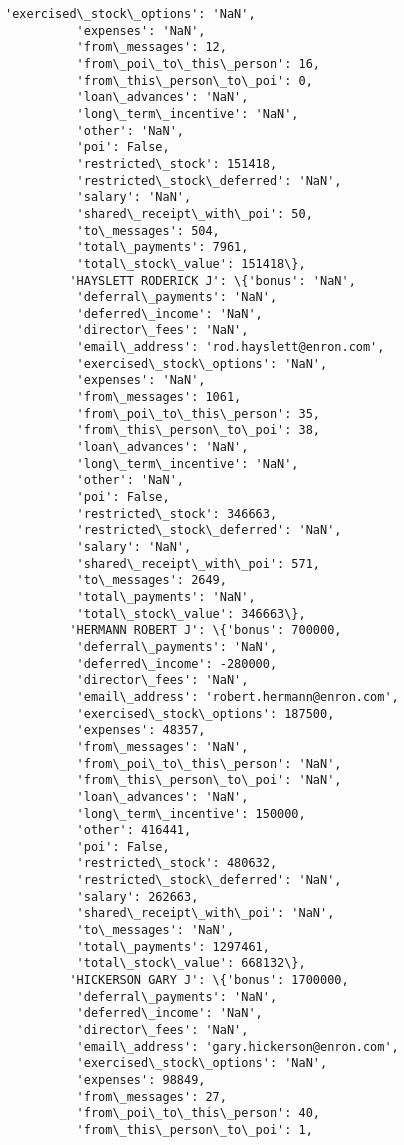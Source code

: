 \documentclass[11pt]{article}
\begin{document}
\begin{Verbatim}[commandchars=\\\{\}]
          'exercised\_stock\_options': 'NaN',
          'expenses': 'NaN',
          'from\_messages': 12,
          'from\_poi\_to\_this\_person': 16,
          'from\_this\_person\_to\_poi': 0,
          'loan\_advances': 'NaN',
          'long\_term\_incentive': 'NaN',
          'other': 'NaN',
          'poi': False,
          'restricted\_stock': 151418,
          'restricted\_stock\_deferred': 'NaN',
          'salary': 'NaN',
          'shared\_receipt\_with\_poi': 50,
          'to\_messages': 504,
          'total\_payments': 7961,
          'total\_stock\_value': 151418\},
         'HAYSLETT RODERICK J': \{'bonus': 'NaN',
          'deferral\_payments': 'NaN',
          'deferred\_income': 'NaN',
          'director\_fees': 'NaN',
          'email\_address': 'rod.hayslett@enron.com',
          'exercised\_stock\_options': 'NaN',
          'expenses': 'NaN',
          'from\_messages': 1061,
          'from\_poi\_to\_this\_person': 35,
          'from\_this\_person\_to\_poi': 38,
          'loan\_advances': 'NaN',
          'long\_term\_incentive': 'NaN',
          'other': 'NaN',
          'poi': False,
          'restricted\_stock': 346663,
          'restricted\_stock\_deferred': 'NaN',
          'salary': 'NaN',
          'shared\_receipt\_with\_poi': 571,
          'to\_messages': 2649,
          'total\_payments': 'NaN',
          'total\_stock\_value': 346663\},
         'HERMANN ROBERT J': \{'bonus': 700000,
          'deferral\_payments': 'NaN',
          'deferred\_income': -280000,
          'director\_fees': 'NaN',
          'email\_address': 'robert.hermann@enron.com',
          'exercised\_stock\_options': 187500,
          'expenses': 48357,
          'from\_messages': 'NaN',
          'from\_poi\_to\_this\_person': 'NaN',
          'from\_this\_person\_to\_poi': 'NaN',
          'loan\_advances': 'NaN',
          'long\_term\_incentive': 150000,
          'other': 416441,
          'poi': False,
          'restricted\_stock': 480632,
          'restricted\_stock\_deferred': 'NaN',
          'salary': 262663,
          'shared\_receipt\_with\_poi': 'NaN',
          'to\_messages': 'NaN',
          'total\_payments': 1297461,
          'total\_stock\_value': 668132\},
         'HICKERSON GARY J': \{'bonus': 1700000,
          'deferral\_payments': 'NaN',
          'deferred\_income': 'NaN',
          'director\_fees': 'NaN',
          'email\_address': 'gary.hickerson@enron.com',
          'exercised\_stock\_options': 'NaN',
          'expenses': 98849,
          'from\_messages': 27,
          'from\_poi\_to\_this\_person': 40,
          'from\_this\_person\_to\_poi': 1,

\end{Verbatim}
\end{document}
